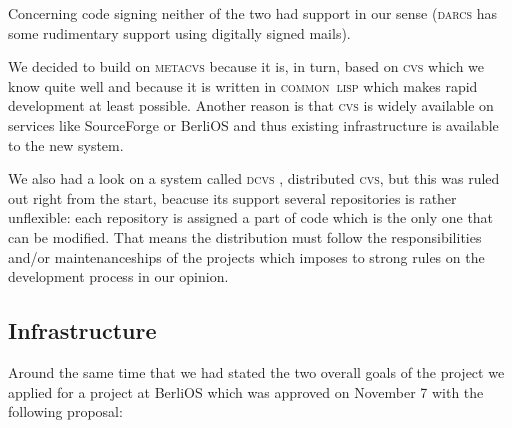 \documentclass[fleqn, 10pt, a4paper]{report} \usepackage{amssymb}
\begin{document}
Concerning code signing neither of the two had support in our sense
(\textsc{darcs} has some rudimentary support using digitally signed
mails).

We decided to build on \textsc{metacvs} because it is, in turn, based
on \textsc{cvs} which we know quite well and because it is written in
\textsc{common~lisp} which makes rapid development at least possible.
Another reason is that \textsc{cvs} is widely available on services
like SourceForge \cite{Sour06} or BerliOS \cite{Berl06}
and thus existing infrastructure is available to the new system.

We also had a look on a system called \textsc{dcvs} \cite{Dcvs06}, distributed
\textsc{cvs}, but this was ruled out right from the start, beacuse its
support several repositories is rather unflexible: each repository is
assigned a part of code which is the only one that can be modified.
That means the distribution must follow the responsibilities and/or
maintenanceships of the projects which imposes to strong rules on the
development process in our opinion.

\subsection{Infrastructure}

Around the same time that we had stated the two overall goals of the
project we applied for a project at BerliOS which was approved on
November 7 with the following proposal:
\end{document}
